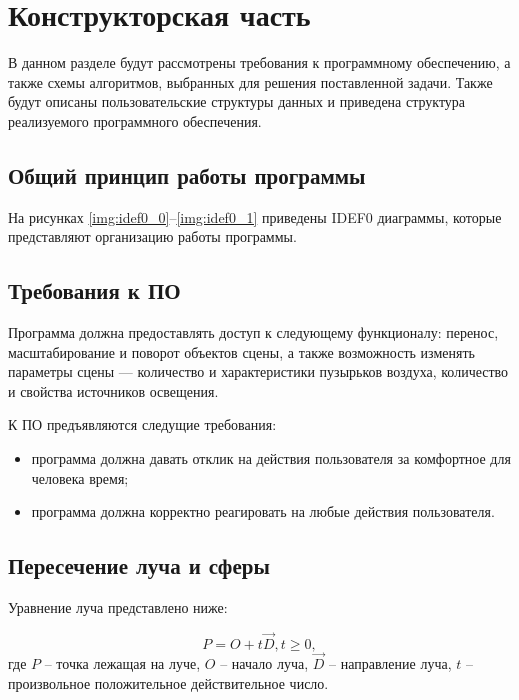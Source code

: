 \chapter{Конструкторская часть}

В данном разделе будут рассмотрены требования к программному обеспечению, а также схемы алгоритмов, выбранных для решения поставленной задачи. Также будут описаны пользовательские структуры данных и приведена структура реализуемого программного обеспечения.

\section{Общий принцип работы программы}

На рисунках \ref{img:idef0_0}--\ref{img:idef0_1} приведены IDEF0 диаграммы, которые представляют организацию работы программы.



\newpage

\section{Требования к ПО}

Программа должна предоставлять доступ к следующему функционалу: перенос, масштабирование и поворот объектов сцены, а также возможность изменять параметры сцены --- количество и характеристики пузырьков воздуха, количество и свойства источников освещения.

К ПО предъявляются следущие требования:
\begin{itemize}
	\item программа должна давать отклик на действия пользователя за комфортное для человека время;
	\item программа должна корректно реагировать на любые действия пользователя.
\end{itemize}

\section{Пересечение луча и сферы}

Уравнение луча представлено ниже:

\begin{equation}
	P = O + t\overrightarrow{D}, t \geq 0,
	\label{eq:ref5}
\end{equation}
где \( P \) -- точка лежащая на луче, \( O \) -- начало луча, $\overrightarrow{D}$ -- направление луча, \( t \) -- произвольное положительное действительное число.

